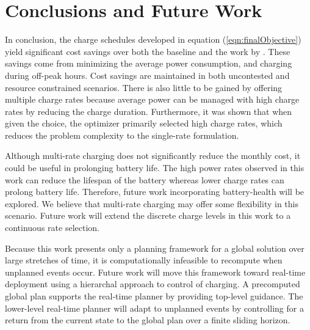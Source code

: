\section{Conclusions and Future Work }
In conclusion, the charge schedules developed in equation (\ref{eqn:finalObjective}) yield significant cost savings over both the baseline and the work by \cite{He_2022_Battery}. These savings come from minimizing the average power consumption, and charging during off-peak hours. Cost savings are maintained in both uncontested and resource constrained scenarios.  There is also little to be gained by offering multiple charge rates because average power can be managed with high charge rates by reducing the charge duration. Furthermore, it was shown that when given the choice, the optimizer primarily selected high charge rates, which reduces the problem complexity to the single-rate formulation.
\par Although multi-rate charging does not significantly reduce the monthly cost, it could be useful in prolonging battery life. The high power rates observed in this work can reduce the lifespan of the battery whereas lower charge rates can prolong battery life.  Therefore, future work incorporating battery-health will be explored.  We believe that multi-rate charging may offer some flexibility in this scenario.  Future work will extend the discrete charge levels in this work to a continuous rate selection.
\par Because this work presents only a planning framework for a global solution over large stretches of time, it is computationally infeasible to recompute when unplanned events occur. Future work will move this framework toward real-time deployment using a hierarchal approach to control of charging.  A precomputed global plan supports the real-time planner by providing top-level guidance.  The lower-level real-time planner will adapt to unplanned events by controlling for a return from the current state to the global plan over a finite sliding horizon.

